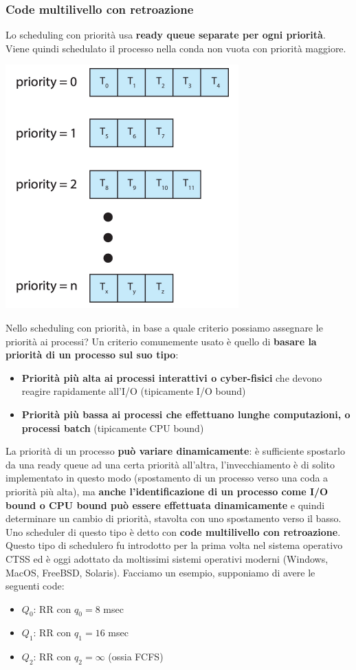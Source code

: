 \documentclass[12pt]{article}
\begin{document}
\subsubsection{Code multilivello con retroazione}
Lo scheduling con priorità usa \textbf{ready queue separate per ogni priorità}. Viene quindi schedulato il processo nella conda non vuota con priorità maggiore.
\begin{center}
    \includegraphics[width = 0.30\linewidth]{Images/51.png}
\end{center}
Nello scheduling con priorità, in base a quale criterio possiamo assegnare le priorità ai processi?
Un criterio comunemente usato è quello di \textbf{basare la priorità di un processo sul suo tipo}:
\begin{itemize}
    \item \textbf{Priorità più alta ai processi interattivi o cyber-fisici} che devono reagire rapidamente all'I/O (tipicamente I/O bound)
    \item \textbf{Priorità più bassa ai processi che effettuano lunghe computazioni, o processi batch} (tipicamente CPU bound)
\end{itemize}
La priorità di un processo \textbf{può variare dinamicamente}: è sufficiente spostarlo da una ready queue ad una certa priorità all'altra, l'invecchiamento
è di solito implementato in questo modo (spostamento di un processo verso una coda a priorità più alta), ma \textbf{anche l'identificazione di un processo come I/O bound o CPU bound può essere effettuata dinamicamente} e quindi determinare un cambio di priorità, stavolta con uno spostamento verso il basso.
Uno scheduler di questo tipo è detto con \textbf{code multilivello con retroazione}. Questo tipo di schedulero fu introdotto per la prima volta nel sistema operativo CTSS ed è oggi adottato da moltissimi sistemi operativi moderni (Windows, MacOS, FreeBSD, Solaris).
Facciamo un esempio, supponiamo di avere le seguenti code:
\begin{itemize}
    \item $Q_0$: RR con $q_0 = 8$ msec
    \item $Q_1$: RR con $q_1 = 16$ msec
    \item $Q_2$: RR con $q_2 = \infty$ (ossia FCFS)
\end{itemize}
\end{document}
